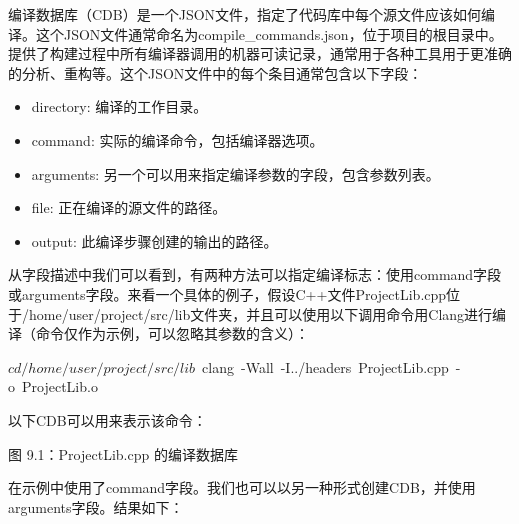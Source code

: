 编译数据库（CDB）是一个JSON文件，指定了代码库中每个源文件应该如何编译。这个JSON文件通常命名为compile\_commands.json，位于项目的根目录中。提供了构建过程中所有编译器调用的机器可读记录，通常用于各种工具用于更准确的分析、重构等。这个JSON文件中的每个条目通常包含以下字段：

\begin{itemize}
\item
directory: 编译的工作目录。

\item
command: 实际的编译命令，包括编译器选项。

\item
arguments: 另一个可以用来指定编译参数的字段，包含参数列表。

\item
file: 正在编译的源文件的路径。

\item
output: 此编译步骤创建的输出的路径。
\end{itemize}

从字段描述中我们可以看到，有两种方法可以指定编译标志：使用command字段或arguments字段。来看一个具体的例子，假设C++文件ProjectLib.cpp位于/home/user/project/src/lib文件夹，并且可以使用以下调用命令用Clang进行编译（命令仅作为示例，可以忽略其参数的含义）：

\begin{shell}
$ cd /home/user/project/src/lib
$ clang -Wall -I../headers ProjectLib.cpp -o ProjectLib.o
\end{shell}

以下CDB可以用来表示该命令：

\begin{shell}
\end{shell}

\begin{center}
图 9.1：ProjectLib.cpp 的编译数据库
\end{center}

在示例中使用了command字段。我们也可以以另一种形式创建CDB，并使用arguments字段。结果如下：

\begin{shell}
\end{shell}

